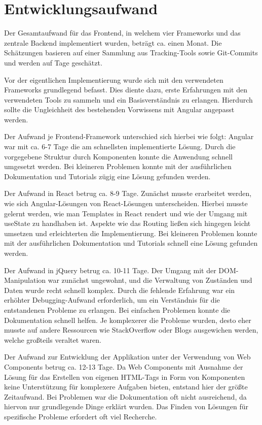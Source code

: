 \documentclass[oneside]{ausarbeitung}
\begin{document}
\section{Entwicklungsaufwand}

Der Gesamtaufwand für das Frontend, in welchem vier Frameworks und das zentrale Backend implementiert wurden, beträgt ca. einen Monat. Die Schätzungen basieren auf einer Sammlung aus Tracking-Tools sowie Git-Commits und werden auf Tage geschätzt.

Vor der eigentlichen Implementierung wurde sich mit den verwendeten Frameworks grundlegend befasst. Dies diente dazu, erste Erfahrungen mit den verwendeten Tools zu sammeln und ein Basisverständnis zu erlangen. Hierdurch sollte die Ungleichheit des bestehenden Vorwissens mit Angular angepasst werden.

Der Aufwand je Frontend-Framework unterschied sich hierbei wie folgt: Angular war mit ca. 6-7 Tage die am schnellsten implementierte Lösung. Durch die vorgegebene Struktur durch Komponenten konnte die Anwendung schnell umgesetzt werden. Bei kleineren Problemen konnte mit der ausführlichen Dokumentation und Tutorials zügig eine Lösung gefunden werden.

Der Aufwand in React betrug ca. 8-9 Tage. Zunächst musste erarbeitet werden, wie sich Angular-Lösungen von React-Lösungen unterscheiden. Hierbei musste gelernt werden, wie man Templates in React rendert und wie der Umgang mit useState zu handhaben ist. Aspekte wie das Routing ließen sich hingegen leicht umsetzen und erleichterten die Implementierung. Bei kleineren Problemen konnte mit der ausführlichen Dokumentation und Tutorials schnell eine Lösung gefunden werden.

Der Aufwand in jQuery betrug ca. 10-11 Tage. Der Umgang mit der DOM-Manipulation war zunächst ungewohnt, und die Verwaltung von Zuständen und Daten wurde recht schnell komplex. Durch die fehlende Erfahrung war ein erhöhter Debugging-Aufwand erforderlich, um ein Verständnis für die entstandenen Probleme zu erlangen. Bei einfachen Problemen konnte die Dokumentation schnell helfen. Je komplexerer die Probleme wurden, desto eher musste auf andere Ressourcen wie StackOverflow oder Blogs ausgewichen werden, welche großteils veraltet waren.  

Der Aufwand zur Entwicklung der Applikation unter der Verwendung von Web Components betrug ca. 12-13 Tage. Da Web Components mit Ausnahme der Lösung für das Erstellen von eigenen HTML-Tags in Form von Komponenten keine Unterstützung für komplexere Aufgaben bieten, entstand hier der größte Zeitaufwand. Bei Problemen war die Dokumentation oft nicht ausreichend, da hiervon nur grundlegende Dinge erklärt wurden. Das Finden von Lösungen für spezifische Probleme erfordert oft viel Recherche.
\end{document}
